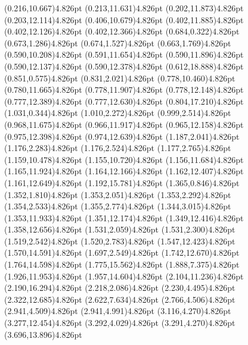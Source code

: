 \documentclass[10pt]{article}
\begin{document}
{{\qdisk(0.216,10.667){4.826pt}%
\qdisk(0.213,11.631){4.826pt}%
\qdisk(0.202,11.873){4.826pt}%
\qdisk(0.203,12.114){4.826pt}%
\qdisk(0.406,10.679){4.826pt}%
\qdisk(0.402,11.885){4.826pt}%
\qdisk(0.402,12.126){4.826pt}%
\qdisk(0.402,12.366){4.826pt}%
\qdisk(0.684,0.322){4.826pt}%
\qdisk(0.673,1.286){4.826pt}%
\qdisk(0.674,1.527){4.826pt}%
\qdisk(0.663,1.769){4.826pt}%
\qdisk(0.590,10.208){4.826pt}%
\qdisk(0.591,11.654){4.826pt}%
\qdisk(0.590,11.896){4.826pt}%
\qdisk(0.590,12.137){4.826pt}%
\qdisk(0.590,12.378){4.826pt}%
\qdisk(0.612,18.888){4.826pt}%
\qdisk(0.851,0.575){4.826pt}%
\qdisk(0.831,2.021){4.826pt}%
\qdisk(0.778,10.460){4.826pt}%
\qdisk(0.780,11.665){4.826pt}%
\qdisk(0.778,11.907){4.826pt}%
\qdisk(0.778,12.148){4.826pt}%
\qdisk(0.777,12.389){4.826pt}%
\qdisk(0.777,12.630){4.826pt}%
\qdisk(0.804,17.210){4.826pt}%
\qdisk(1.031,0.344){4.826pt}%
\qdisk(1.010,2.272){4.826pt}%
\qdisk(0.999,2.514){4.826pt}%
\qdisk(0.968,11.675){4.826pt}%
\qdisk(0.966,11.917){4.826pt}%
\qdisk(0.965,12.158){4.826pt}%
\qdisk(0.975,12.398){4.826pt}%
\qdisk(0.974,12.639){4.826pt}%
\qdisk(1.187,2.041){4.826pt}%
\qdisk(1.176,2.283){4.826pt}%
\qdisk(1.176,2.524){4.826pt}%
\qdisk(1.177,2.765){4.826pt}%
\qdisk(1.159,10.478){4.826pt}%
\qdisk(1.155,10.720){4.826pt}%
\qdisk(1.156,11.684){4.826pt}%
\qdisk(1.165,11.924){4.826pt}%
\qdisk(1.164,12.166){4.826pt}%
\qdisk(1.162,12.407){4.826pt}%
\qdisk(1.161,12.649){4.826pt}%
\qdisk(1.192,15.781){4.826pt}%
\qdisk(1.365,0.846){4.826pt}%
\qdisk(1.352,1.810){4.826pt}%
\qdisk(1.353,2.051){4.826pt}%
\qdisk(1.353,2.292){4.826pt}%
\qdisk(1.354,2.533){4.826pt}%
\qdisk(1.355,2.774){4.826pt}%
\qdisk(1.344,3.015){4.826pt}%
\qdisk(1.353,11.933){4.826pt}%
\qdisk(1.351,12.174){4.826pt}%
\qdisk(1.349,12.416){4.826pt}%
\qdisk(1.358,12.656){4.826pt}%
\qdisk(1.531,2.059){4.826pt}%
\qdisk(1.531,2.300){4.826pt}%
\qdisk(1.519,2.542){4.826pt}%
\qdisk(1.520,2.783){4.826pt}%
\qdisk(1.547,12.423){4.826pt}%
\qdisk(1.570,14.591){4.826pt}%
\qdisk(1.697,2.549){4.826pt}%
\qdisk(1.742,12.670){4.826pt}%
\qdisk(1.764,14.598){4.826pt}%
\qdisk(1.775,15.562){4.826pt}%
\qdisk(1.888,7.375){4.826pt}%
\qdisk(1.926,11.953){4.826pt}%
\qdisk(1.957,14.604){4.826pt}%
\qdisk(2.104,11.236){4.826pt}%
\qdisk(2.190,16.294){4.826pt}%
\qdisk(2.218,2.086){4.826pt}%
\qdisk(2.230,4.495){4.826pt}%
\qdisk(2.322,12.685){4.826pt}%
\qdisk(2.622,7.634){4.826pt}%
\qdisk(2.766,4.506){4.826pt}%
\qdisk(2.941,4.509){4.826pt}%
\qdisk(2.941,4.991){4.826pt}%
\qdisk(3.116,4.270){4.826pt}%
\qdisk(3.277,12.454){4.826pt}%
\qdisk(3.292,4.029){4.826pt}%
\qdisk(3.291,4.270){4.826pt}%
\qdisk(3.696,13.896){4.826pt}%
}}
\end{document}
